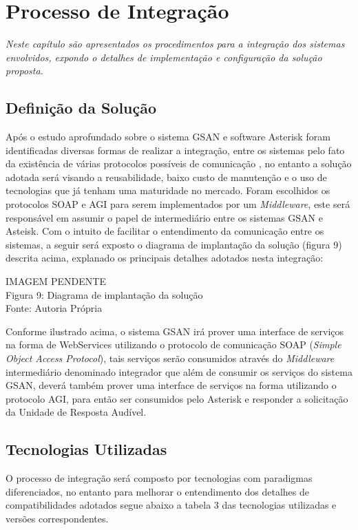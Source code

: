 \chapter[Processo de Integração]{\textbf{P}rocesso de \textbf{I}ntegração}

\textit{Neste capítulo são apresentados os procedimentos para a integração dos sistemas envolvidos, expondo o detalhes de implementação e configuração da solução proposta.}


\section{Definição da Solução}

Após o estudo aprofundado sobre o sistema GSAN e software Asterisk foram identificadas diversas formas de realizar a integração, entre os sistemas pelo fato da existência de várias protocolos possíveis de comunicação , no entanto a solução adotada será visando a reusabilidade, baixo custo de manutenção e o uso de tecnologias que já tenham uma maturidade no mercado. Foram escolhidos os protocolos SOAP e AGI para serem implementados por um \textit{Middleware}, este será responsável em assumir o papel de intermediário entre os sistemas GSAN e Asteisk. Com o intuito de facilitar o entendimento da comunicação entre os sistemas, a seguir será exposto o diagrama de implantação da solução (figura 9) descrita acima, explanado os principais detalhes adotados nesta integração:

\begin{center}
	IMAGEM PENDENTE \\
	Figura 9: Diagrama de implantação da solução \\
	Fonte: Autoria Própria	\\
\end{center}

Conforme ilustrado acima, o sistema GSAN irá prover uma interface de serviços na forma de WebServices utilizando o protocolo de comunicação SOAP (\textit{Simple Object Access Protocol}), tais serviços serão consumidos através do \textit{Middleware} intermediário denominado integrador que além de consumir os serviços do sistema GSAN, deverá também prover uma interface de serviços na forma utilizando o protocolo AGI, para então ser consumidos pelo Asterisk e responder a solicitação da Unidade de Resposta Audível.


\section{Tecnologias Utilizadas}
O processo de integração será composto por tecnologias com paradigmas diferenciados, no entanto para melhorar o entendimento dos detalhes de compatibilidades adotados segue abaixo a tabela 3 das tecnologias utilizadas e versões correspondentes.


